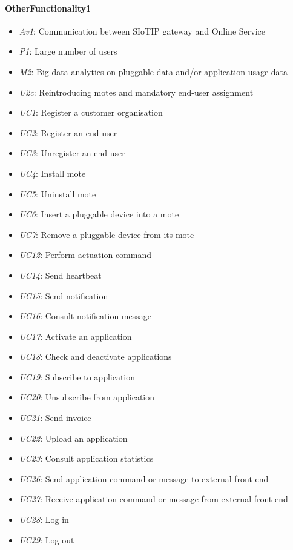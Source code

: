 \documentclass[english]{sareport}
\begin{document}
\paragraph{OtherFunctionality1}
\begin{itemize}
	\item \emph{Av1}: Communication between SIoTIP gateway and Online Service
	\item \emph{P1}: Large number of users
	\item \emph{M2}: Big data analytics on pluggable data and/or application usage data
	\item \emph{U2c}: Reintroducing motes and mandatory end-user assignment
	\item \emph{UC1}: Register a customer organisation
	\item \emph{UC2}: Register an end-user
	\item \emph{UC3}: Unregister an end-user
	\item \emph{UC4}: Install mote
	\item \emph{UC5}: Uninstall mote
	\item \emph{UC6}: Insert a pluggable device into a mote
	\item \emph{UC7}: Remove a pluggable device from its mote
	\item \emph{UC12}: Perform actuation command
	\item \emph{UC14}: Send heartbeat
	\item \emph{UC15}: Send notification
	\item \emph{UC16}: Consult notification message
	\item \emph{UC17}: Activate an application
	\item \emph{UC18}: Check and deactivate applications
	\item \emph{UC19}: Subscribe to application
	\item \emph{UC20}: Unsubscribe from application
	\item \emph{UC21}: Send invoice
	\item \emph{UC22}: Upload an application
	\item \emph{UC23}: Consult application statistics
	\item \emph{UC26}: Send application command or message to external front-end
	\item \emph{UC27}: Receive application command or message from external front-end
	\item \emph{UC28}: Log in
	\item \emph{UC29}: Log out
\end{itemize}
\end{document}
